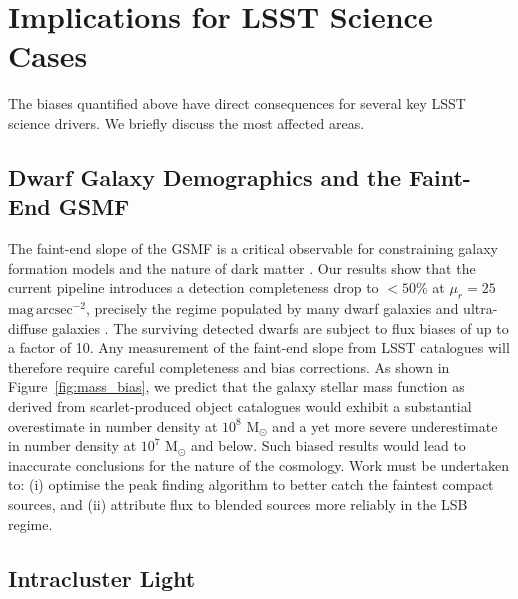 \documentclass[DM,lsstdraft,authoryear,toc]{lsstdoc}
\newcommand{\mur}{\ensuremath{\mu_r}\xspace}
\begin{document}
\section{Implications for LSST Science Cases}
\label{sec:implications}

The biases quantified above have direct consequences for several key LSST
science drivers. We briefly discuss the most affected areas.

\subsection{Dwarf Galaxy Demographics and the Faint-End GSMF}
\label{sec:implications_dwarfs}

The faint-end slope of the GSMF is a critical observable for constraining
galaxy formation models \citep[e.g.][]{Benson2003,Baldry2012} and the nature
of dark matter \citep[e.g.][]{BullockBoylanKolchin2017}. Our results show
that the current pipeline introduces a detection completeness drop to
${<}50\%$ at $\mur = 25$~$\mathrm{mag\,arcsec^{-2}}$, precisely the regime
populated by many dwarf galaxies and ultra-diffuse galaxies
\citep{vanDokkum2015,Martin2019}. The surviving detected dwarfs are subject
to flux biases of up to a factor of 10. Any measurement of the faint-end
slope from LSST catalogues will therefore require careful completeness and
bias corrections. As shown in Figure~\ref{fig:mass_bias}, we predict that
the galaxy stellar mass function as derived from scarlet-produced object catalogues
would exhibit a substantial overestimate in number density at $10^8$ M$_{\odot}$
and a yet more severe underestimate in number density at $10^7$ M$_{\odot}$ and below.
Such biased results would lead to inaccurate conclusions for the nature of the cosmology.
Work must be undertaken to: (i) optimise the peak finding algorithm to better catch the faintest compact sources, and
(ii) attribute flux to blended sources more reliably in the LSB regime.

\subsection{Intracluster Light}
\label{sec:implications_icl}
\end{document}

